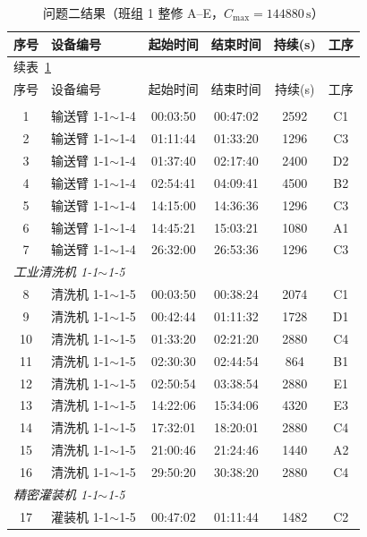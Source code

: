 \documentclass[12pt,a4paper]{ctexart}
\begin{document}
\begin{longtable}{c p{4.6cm} c c c c}
\caption{问题二结果（班组 1 整修 A--E，$C_{\max}=144880\,\mathrm{s}$）}\label{tab:q2}\\
\toprule
序号 & 设备编号 & 起始时间 & 结束时间 & 持续(s) & 工序 \\
\midrule
\endfirsthead
\multicolumn{6}{l}{\small 续表~\ref{tab:q2}}\\
\toprule
序号 & 设备编号 & 起始时间 & 结束时间 & 持续(s) & 工序 \\
\midrule
\endhead
\bottomrule
\endfoot
\multicolumn{6}{l}{\textit{自动化输送臂 1-1$\sim$1-4}}\\
1 & 输送臂 1-1$\sim$1-4 & 00:03:50 & 00:47:02 & 2592 & C1 \\
2 & 输送臂 1-1$\sim$1-4 & 01:11:44 & 01:33:20 & 1296 & C3 \\
3 & 输送臂 1-1$\sim$1-4 & 01:37:40 & 02:17:40 & 2400 & D2 \\
4 & 输送臂 1-1$\sim$1-4 & 02:54:41 & 04:09:41 & 4500 & B2 \\
5 & 输送臂 1-1$\sim$1-4 & 14:15:00 & 14:36:36 & 1296 & C3 \\
6 & 输送臂 1-1$\sim$1-4 & 14:45:21 & 15:03:21 & 1080 & A1 \\
7 & 输送臂 1-1$\sim$1-4 & 26:32:00 & 26:53:36 & 1296 & C3 \\
\midrule
\multicolumn{6}{l}{\textit{工业清洗机 1-1$\sim$1-5}}\\
8 & 清洗机 1-1$\sim$1-5 & 00:03:50 & 00:38:24 & 2074 & C1 \\
9 & 清洗机 1-1$\sim$1-5 & 00:42:44 & 01:11:32 & 1728 & D1 \\
10 & 清洗机 1-1$\sim$1-5 & 01:33:20 & 02:21:20 & 2880 & C4 \\
11 & 清洗机 1-1$\sim$1-5 & 02:30:30 & 02:44:54 & 864 & B1 \\
12 & 清洗机 1-1$\sim$1-5 & 02:50:54 & 03:38:54 & 2880 & E1 \\
13 & 清洗机 1-1$\sim$1-5 & 14:22:06 & 15:34:06 & 4320 & E3 \\
14 & 清洗机 1-1$\sim$1-5 & 17:32:01 & 18:20:01 & 2880 & C4 \\
15 & 清洗机 1-1$\sim$1-5 & 21:00:46 & 21:24:46 & 1440 & A2 \\
16 & 清洗机 1-1$\sim$1-5 & 29:50:20 & 30:38:20 & 2880 & C4 \\
\midrule
\multicolumn{6}{l}{\textit{精密灌装机 1-1$\sim$1-5}}\\
17 & 灌装机 1-1$\sim$1-5 & 00:47:02 & 01:11:44 & 1482 & C2 \\

\end{longtable}
\end{document}
